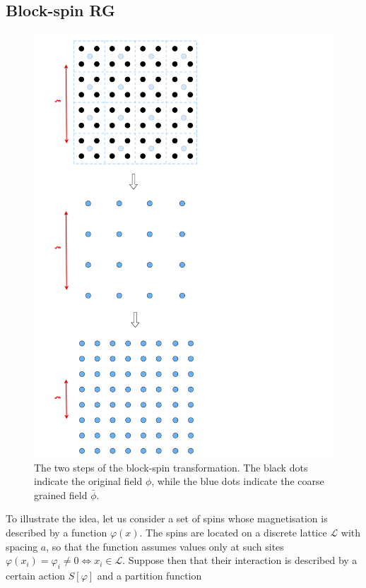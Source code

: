 \subsection{Block-spin RG}
\label{sec:blockspin}
\begin{figure}
    \centering 
    \includegraphics[angle=90,scale=0.34]{figures/blockspin.pdf}
    \caption[Block-spin transformation]{The two steps of the block-spin transformation. The black dots indicate the original field $\phi$, while the blue dots indicate the coarse grained field $\bar \phi$.}
    \label{fig:blockin_first}
\end{figure}
To illustrate the idea, let us consider a set of spins whose magnetisation is described by a function $\varphi(x)$. The spins are located on a discrete lattice $\mathscr{L}$ with spacing $a$, so that the function assumes values only at such sites $\varphi(x_i) = \varphi_i \neq 0 \Leftrightarrow x_i \in \mathscr{L}$. Suppose then that their interaction is described by a certain action $S[\varphi]$ and a partition function
